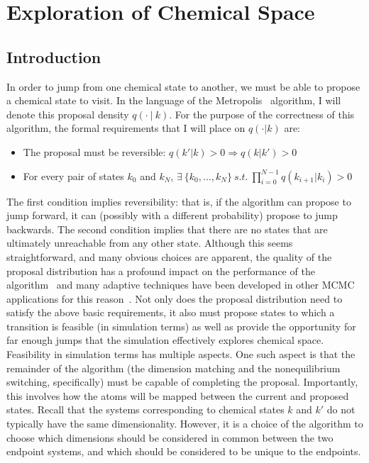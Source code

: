 \chapter{Exploration of Chemical Space}
%
\section{Introduction}
%
In order to jump from one chemical state to another, we must be able to propose a chemical state to visit. In the language of the Metropolis~\cite{Hastings1970} algorithm, I will denote this proposal density $q(\cdot~|~k)$.
%
For the purpose of the correctness of this algorithm, the formal requirements that I will place on $q(\cdot | k)$ are:
\begin{itemize}
    \item The proposal must be reversible: $q(k'|k) > 0 \Rightarrow q(k|k') >0$
    \item For every pair of states $k_0$ and $k_N$, $\exists \ \{k_0, ... ,k_N\} \ s.t. \ \prod\limits_{i=0}^{N-1} q(k_{i+1}|k_i) > 0$
\end{itemize}
%
The first condition implies reversibility: that is, if the algorithm can propose to jump forward, it can (possibly with a different probability) propose to jump backwards. The second condition implies that there are no states that are ultimately unreachable from any other state.
%
Although this seems straightforward, and many obvious choices are apparent, the quality of the proposal distribution has a profound impact on the performance of the algorithm~\cite{vanRavenzwaaij2018} and many adaptive techniques have been developed in other MCMC applications for this reason~\cite{Roberts2009}.
%
Not only does the proposal distribution need to satisfy the above basic requirements, it also must propose states to which a transition is feasible (in simulation terms) as well as provide the opportunity for far enough jumps that the simulation effectively explores chemical space. 
%
Feasibility in simulation terms has multiple aspects.
%
One such aspect is that the remainder of the algorithm (the dimension matching and the nonequilibrium switching, specifically) must be capable of completing the proposal.
%
Importantly, this involves how the atoms will be mapped between the current and proposed states.
%
Recall that the systems corresponding to chemical states $k$ and $k'$ do not typically have the same dimensionality.
%
However, it is a choice of the algorithm to choose which dimensions should be considered in common between the two endpoint systems, and which should be considered to be unique to the endpoints.

